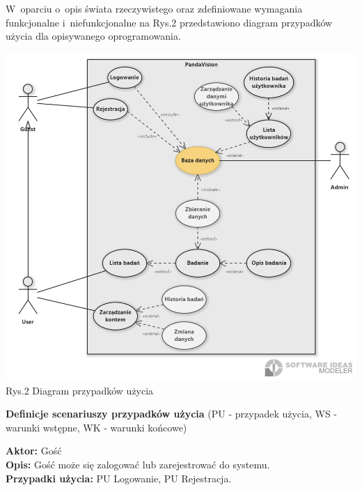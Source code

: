 \documentclass[12pt, letterpaper]{article}
\begin{document}
		W~oparciu o~opis świata rzeczywistego oraz zdefiniowane wymagania funkcjonalne i~niefunkcjonalne na Rys.2 przedstawiono diagram przypadków użycia dla opisywanego oprogramowania.
		
		\begin{center}
			\includegraphics[scale=0.5]{useCaseDiagram}\\
			\caption{Rys.2 Diagram przypadków użycia}
		\end{center}		
		
		

		\newpage		
		
		\textbf{Definicje scenariuszy przypadków użycia} (PU - przypadek użycia, WS - warunki wstępne, WK - warunki końcowe)\\
		
		\quad		
		
		\textbf{Aktor:} Gość\\
		
		\textbf{Opis:} Gość może się zalogować lub zarejestrować do systemu.\\
		
		\textbf{Przypadki użycia:} PU Logowanie, PU Rejestracja.
		
\end{document}

